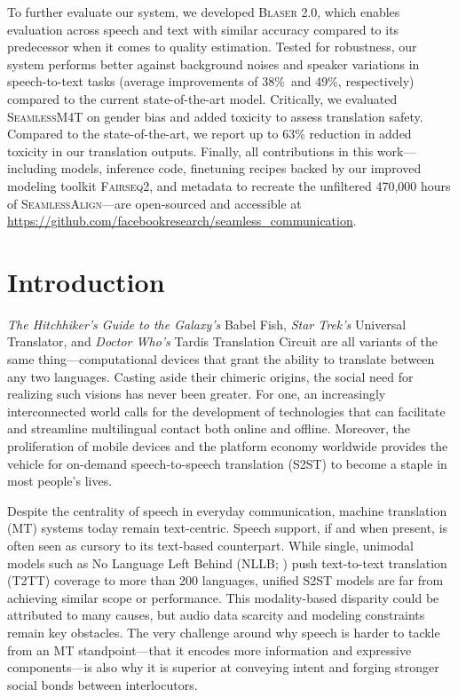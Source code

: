 \documentclass[twoside,11pt]{article}
\newcommand{\mineddata}{\textsc{SeamlessAlign}\xspace}
\newcommand{\mfourt}{\textsc{SeamlessM4T}\xspace}
\newcommand{\mt}{{T2TT}\xspace}
\newcommand{\sst}{{S2ST}\xspace}
\newcommand{\blaser}{\textsc{Blaser 2.0}\xspace}
\newcommand{\fairseq}{\textsc{Fairseq2}\xspace} %
\newcommand{\totalminedhours}{470,000\xspace}
\newcommand{\noiserobustnessgain}{38\%}
\newcommand{\speakerrobustnessgain}{49\%}
\begin{document}
To further evaluate our system, we developed \blaser, which enables evaluation across speech and text with similar accuracy compared to its predecessor when it comes to quality estimation. 
Tested for robustness, our system performs better against background noises and speaker variations in speech-to-text tasks
(average improvements of \noiserobustnessgain~and \speakerrobustnessgain, respectively)
compared to the current state-of-the-art model. 
Critically, we evaluated \mfourt on gender bias and added toxicity to assess translation safety. Compared to the state-of-the-art, we report up to 63\% reduction in added toxicity in our translation outputs. 
Finally, all contributions in this work—including models, inference code, 
finetuning recipes backed by our improved modeling toolkit \fairseq, and metadata to recreate the unfiltered \totalminedhours hours of \mineddata—are open-sourced and accessible at \url{https://github.com/facebookresearch/seamless_communication}.







\clearpage
\setcounter{tocdepth}{2}
\tableofcontents
\clearpage


\section{Introduction}
\label{sec:intro}

\textit{The Hitchhiker's Guide to the Galaxy’s} Babel Fish, \textit{Star Trek’s} Universal Translator, and \textit{Doctor Who’s} Tardis Translation Circuit are all variants of the same thing—computational devices that grant the ability to translate between any two languages. Casting aside their chimeric origins, the social need for realizing such visions has never been greater. For one, an increasingly interconnected world calls for the development of technologies that can facilitate and streamline multilingual contact both online and offline. Moreover, the proliferation of mobile devices and the platform economy worldwide provides the vehicle for on-demand speech-to-speech translation (\sst) to become a staple in most people's lives.

Despite the centrality of speech in everyday communication, machine translation (MT) systems today remain text-centric. Speech support, if and when present, is often seen as cursory to its text-based counterpart. While single, unimodal models such as No Language Left Behind (NLLB; \citep{nllb2022}) push text-to-text translation (\mt) coverage to more than 200 languages, unified \sst models are far from achieving similar scope or performance. This modality-based disparity could be attributed to many causes, but audio data scarcity and modeling constraints remain key obstacles. The very challenge around why speech is harder to tackle from an MT standpoint—that it encodes more information and expressive components—is also why it is superior at conveying intent and forging stronger social bonds between interlocutors. 
\end{document}
